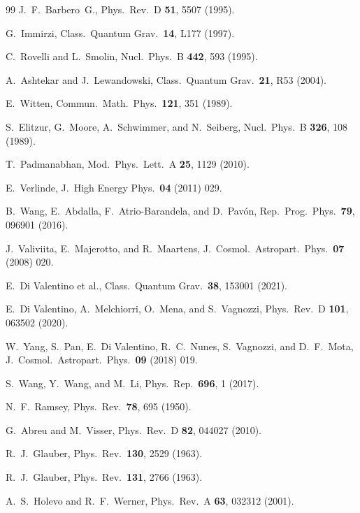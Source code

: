 \documentclass[aps,prd,twocolumn,10pt,superscriptaddress,nofootinbib]{revtex4-2}
\begin{document}
\begin{thebibliography}{99}
J.~F.~Barbero~G.,
Phys.\ Rev.\ D \textbf{51}, 5507 (1995).

G.~Immirzi,
Class.\ Quantum Grav.\ \textbf{14}, L177 (1997).

C.~Rovelli and L.~Smolin,
Nucl.\ Phys.\ B \textbf{442}, 593 (1995).

A.~Ashtekar and J.~Lewandowski,
Class.\ Quantum Grav.\ \textbf{21}, R53 (2004).

E.~Witten,
Commun.\ Math.\ Phys.\ \textbf{121}, 351 (1989).

S.~Elitzur, G.~Moore, A.~Schwimmer, and N.~Seiberg,
Nucl.\ Phys.\ B \textbf{326}, 108 (1989).

T.~Padmanabhan,
Mod.\ Phys.\ Lett.\ A \textbf{25}, 1129 (2010).

E.~Verlinde,
J.\ High Energy Phys.\ \textbf{04} (2011) 029.

B.~Wang, E.~Abdalla, F.~Atrio-Barandela, and D.~Pav\'on,
Rep.\ Prog.\ Phys.\ \textbf{79}, 096901 (2016).

J.~Valiviita, E.~Majerotto, and R.~Maartens,
J.\ Cosmol.\ Astropart.\ Phys.\ \textbf{07} (2008) 020.

E.~Di Valentino et al.,
Class.\ Quantum Grav.\ \textbf{38}, 153001 (2021).

E.~Di Valentino, A.~Melchiorri, O.~Mena, and S.~Vagnozzi,
Phys.\ Rev.\ D \textbf{101}, 063502 (2020).

W.~Yang, S.~Pan, E.~Di Valentino, R.~C.~Nunes, S.~Vagnozzi, and D.~F.~Mota,
J.\ Cosmol.\ Astropart.\ Phys.\ \textbf{09} (2018) 019.

S.~Wang, Y.~Wang, and M.~Li,
Phys.\ Rep.\ \textbf{696}, 1 (2017).




N.~F.~Ramsey,
Phys.\ Rev.\ \textbf{78}, 695 (1950).

G.~Abreu and M.~Visser,
Phys.\ Rev.\ D \textbf{82}, 044027 (2010).

R.~J.~Glauber,
Phys.\ Rev.\ \textbf{130}, 2529 (1963).

R.~J.~Glauber,
Phys.\ Rev.\ \textbf{131}, 2766 (1963).

A.~S.~Holevo and R.~F.~Werner,
Phys.\ Rev.\ A \textbf{63}, 032312 (2001).


\end{thebibliography}
\end{document}
